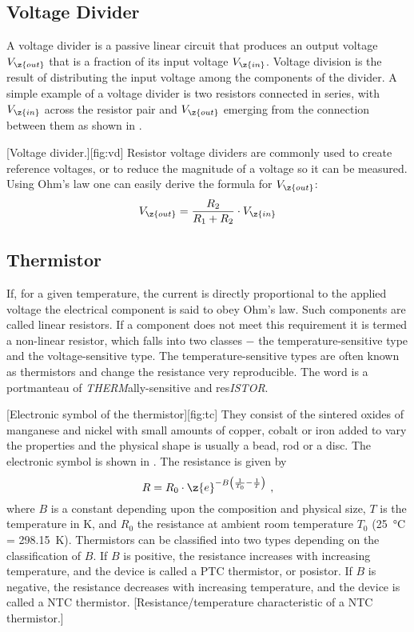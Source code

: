 \subsection{Voltage Divider}\label{sec:vd}
A voltage divider is a passive linear circuit that produces an output voltage $V_{\z{out}}$ that is a fraction of its input voltage $V_{\z{in}}$. Voltage division is the result of distributing the input voltage among the components of the divider. A simple example of a voltage divider is two resistors connected in series, with $V_{\z{in}}$ across the resistor pair and $V_{\z{out}}$ emerging from the connection between them as shown in .\par
%
[Voltage divider.][fig:vd]
%
Resistor voltage dividers are commonly used to create reference voltages, or to reduce the magnitude of a voltage so it can be measured. Using Ohm's law one can easily derive the formula for $V_{\z{out}}$:
%
\begin{equation}\label{eq:vd}
	V_{\z{out}} = \dfrac{R_{2}}{R_{1} + R_{2}}\cdot V_{\z{in}}
\end{equation}
%
\subsection{Thermistor}\label{sec:therm}
If, for a given temperature, the current is directly proportional to the applied voltage the electrical component is said to obey Ohm's law. Such components are called linear resistors. If a component does not meet this requirement it is termed a non-linear resistor, which falls into two classes $-$ the temperature-sensitive type and the voltage-sensitive type. The temperature-sensitive types are often known as thermistors and change the resistance very reproducible. The word is a portmanteau of \textit{THERM}ally-sensitive and res\textit{ISTOR}.\par
%
[Electronic symbol of the thermistor][fig:tc]
%
They consist of the sintered oxides of manganese and nickel with small amounts of copper, cobalt or iron added to vary the properties and the physical shape is usually a bead, rod or a disc. The electronic symbol is shown in . The resistance is given by
%
\begin{equation}\label{eq:th}
	R = R_{0}\cdot\z{e}^{-B\left(\frac{1}{T_{0}} - \frac{1}{T}\right)}\ ,
\end{equation}
%
where $B$ is a constant depending upon the composition and physical size, $T$ is the temperature in \si{\kelvin}, and $R_{0}$ the resistance at ambient room temperature $T_{0}$ (\SI{25}{\celsius} = \SI{298.15}{\kelvin}). Thermistors can be classified into two types depending on the classification of $B$. If $B$ is positive, the resistance increases with increasing temperature, and the device is called a \ac{PTC} thermistor, or posistor. If $B$ is negative, the resistance decreases with increasing temperature, and the device is called a \ac{NTC} thermistor.
%
[Resistance/temperature characteristic of a \ac{NTC} thermistor.]
%

